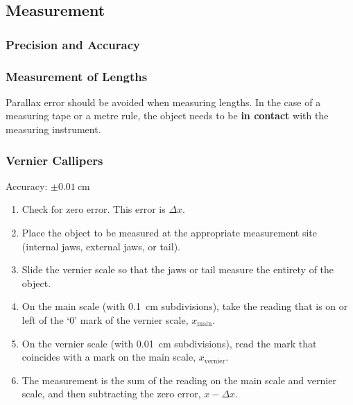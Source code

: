 \documentclass[../main.tex]{subfiles}
\begin{document}
		\subsection{Measurement}
		\subsubsection{Precision and Accuracy}
		
		
		
		\subsubsection{Measurement of Lengths}
		Parallax error should be avoided when measuring lengths. In the case of a measuring tape or a metre rule, the object needs to be \textbf{in contact} with the measuring instrument.
		
		\subsubsection*{Vernier Callipers}
		Accuracy: \(\pm \SI{0.01}{\centi\meter}\)
		\begin{enumerate}
			\item Check for zero error. This error is \(\Delta x\).
			\item Place the object to be measured at the appropriate measurement site (internal jaws, external jaws, or tail).
			\item Slide the vernier scale so that the jaws or tail measure the entirety of the object.
			\item On the main scale (with \SI{0.1}{\centi\meter} subdivisions), take the reading that is on or left of the `0' mark of the vernier scale, \(x_{\mathrm{main}}\).
			\item On the vernier scale (with \SI{0.01}{\centi\meter} subdivisions), read the mark that coincides with a mark on the main scale, \(x_{\mathrm{vernier}}\).
			\item The measurement is the sum of the reading on the main scale and vernier scale, and then subtracting the zero error, \(x-\Delta x\).
		\end{enumerate}
	
\end{document}
